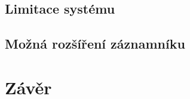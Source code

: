 
\section{Limitace systému}
\label{limitace}


\section{Možná rozšíření záznamníku}
\label{mozne_rozsireni}

\chapter{Závěr}
\label{zaverPrace}



%
